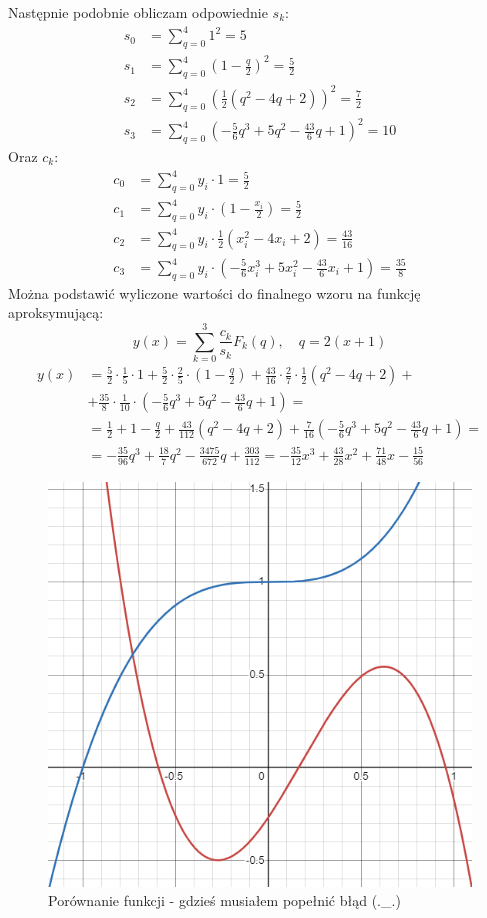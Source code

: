 \documentclass{article}
\begin{document}
\noindent
Następnie podobnie obliczam odpowiednie \(s_k\):
\begin{align*}
    s_0 &= \sum_{q=0}^4 1^2 = 5\\
    s_1 &= \sum_{q=0}^4 \left(1 - \frac{q}{2}\right)^2 = \frac{5}{2}\\
    s_2 &= \sum_{q=0}^4 \left(\frac{1}{2}(q^2 - 4q + 2)\right)^2 = \frac{7}{2}\\
    s_3 &= \sum_{q=0}^4 \left(-\frac{5}{6}q^3 + 5q^2 - \frac{43}{6}q + 1\right)^2 = 10
\end{align*}
Oraz \(c_k\):
\begin{align*}
    c_0 &= \sum_{q=0}^4 y_i \cdot 1 = \frac{5}{2}\\
    c_1 &= \sum_{q=0}^4 y_i \cdot \left(1 - \frac{x_i}{2}\right) = \frac{5}{2}\\
    c_2 &= \sum_{q=0}^4 y_i \cdot \frac{1}{2}(x_i^2 - 4x_i + 2) = \frac{43}{16}\\
    c_3 &= \sum_{q=0}^4 y_i \cdot \left(-\frac{5}{6}x_i^3 + 5x_i^2 - \frac{43}{6}x_i + 1\right) = \frac{35}{8}
\end{align*}
Można podstawić wyliczone wartości do finalnego wzoru na funkcję aproksymującą:
\[y(x) = \sum_{k=0}^3 \frac{c_k}{s_k} F_k(q), \quad q = 2(x+1)\]
\begin{align*}
    y(x) &= \frac{5}{2} \cdot \frac{1}{5} \cdot 1 + \frac{5}{2} \cdot \frac{2}{5} \cdot \left(1 - \frac{q}{2}\right) + \frac{43}{16} \cdot \frac{2}{7} \cdot \frac{1}{2}(q^2 - 4q + 2) +\\
    &+ \frac{35}{8} \cdot \frac{1}{10} \cdot \left(-\frac{5}{6}q^3 + 5q^2 - \frac{43}{6}q + 1\right) =\\
    &= \frac{1}{2} + 1 - \frac{q}{2} + \frac{43}{112}(q^2 - 4q + 2) + \frac{7}{16} \left(-\frac{5}{6}q^3 + 5q^2 - \frac{43}{6}q + 1\right) =\\
    &= -\frac{35}{96}q^3 + \frac{18}{7}q^2 - \frac{3475}{672}q + \frac{303}{112} = -\frac{35}{12}x^3 + \frac{43}{28}x^2 + \frac{71}{48}x - \frac{15}{56}
\end{align*}

\begin{figure}[h]
    \centering
    \includegraphics[width=0.48\linewidth]{graph3.png}
    \caption{Porównanie funkcji - gdzieś musiałem popełnić błąd (.\_.)}
\end{figure}
\end{document}

